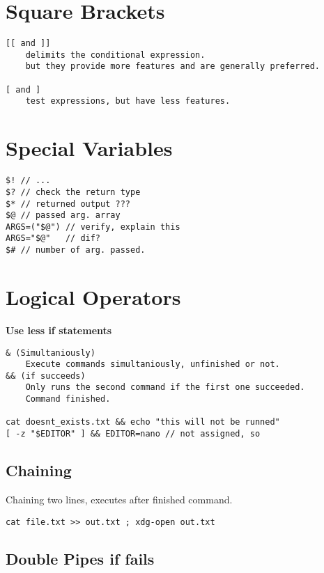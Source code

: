 \section{Square Brackets}

\begin{verbatim}
[[ and ]] 
    delimits the conditional expression. 
    but they provide more features and are generally preferred.

[ and ]
    test expressions, but have less features.
\end{verbatim}

\section{Special Variables}

\begin{verbatim}
$! // ... 
$? // check the return type
$* // returned output ???
$@ // passed arg. array 
ARGS=("$@") // verify, explain this
ARGS="$@"   // dif?
$# // number of arg. passed.
\end{verbatim}

\section{Logical Operators}

\textbf{Use less if statements}

\begin{verbatim}
& (Simultaniously)
    Execute commands simultaniously, unfinished or not.
&& (if succeeds)
    Only runs the second command if the first one succeeded.
    Command finished.

cat doesnt_exists.txt && echo "this will not be runned" 
[ -z "$EDITOR" ] && EDITOR=nano // not assigned, so
\end{verbatim}

\subsection{Chaining}
Chaining two lines, executes after finished command.

\begin{verbatim}
cat file.txt >> out.txt ; xdg-open out.txt 
\end{verbatim}

\subsection{Double Pipes if fails}

